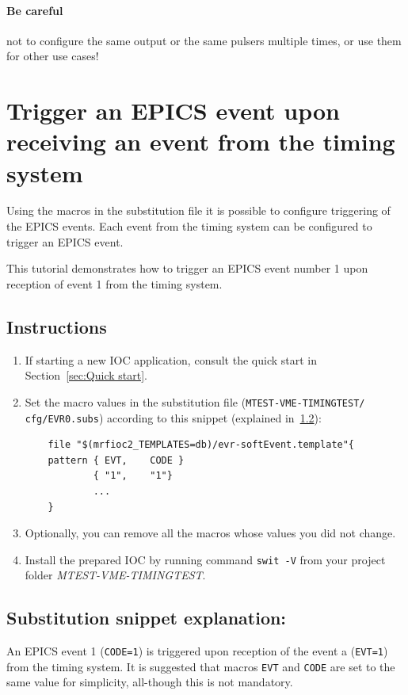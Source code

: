 \documentclass[12pt,a4paper]{article}
\begin{document}
\paragraph{Be careful} not to configure the same output or the same pulsers multiple times, or use them for other use cases!

	
\section{Trigger an EPICS event upon receiving an event from the timing system}
Using the macros in the substitution file it is possible to configure triggering of the EPICS events. Each event from the timing system can be configured to trigger an EPICS event.

This tutorial demonstrates how to trigger an EPICS event number 1 upon reception of event 1 from the timing system.

\subsection{Instructions}
\begin{enumerate}
	\item If starting a new IOC application, consult the quick start in Section~\ref{sec:Quick start}.
	
	\item Set the macro values in the substitution file (\texttt{MTEST-VME-TIMINGTEST/} \texttt{cfg/EVR0.subs}) according to this snippet (explained in~\ref{sec:explain_event}):
\begin{verbatim}
	file "$(mrfioc2_TEMPLATES=db)/evr-softEvent.template"{
	pattern { EVT,    CODE }
	        { "1",    "1"}
	        ...
	}
\end{verbatim}
	\item Optionally, you can remove all the macros whose values you did not change. 

	\item Install the prepared IOC by running command \texttt{swit -V} from your project folder \textit{MTEST-VME-TIMINGTEST}.
\end{enumerate}

\subsection{Substitution snippet explanation:}\label{sec:explain_event}
An EPICS event 1 (\texttt{CODE=1}) is triggered upon reception of the event a (\texttt{EVT=1}) from the timing system.
It is suggested that macros \texttt{EVT} and \texttt{CODE} are set to the same value for simplicity, all-though this is not mandatory.
\end{document}
